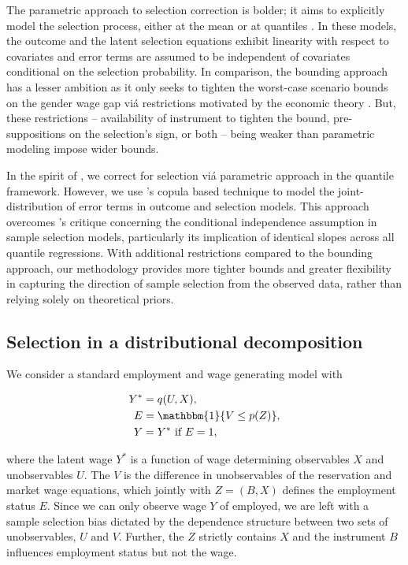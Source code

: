 The parametric approach to selection correction is bolder; it aims to explicitly model the selection process, either at the mean \parencite{Newey2009, Heckman1979, Heckman1974} or at quantiles \parencite{Buchinsky1998}. In these models, the outcome and the latent selection equations exhibit linearity with respect to covariates and error terms are assumed to be independent of covariates conditional on the selection probability. In comparison, the bounding approach has a lesser ambition as it only seeks to tighten the worst-case scenario bounds on the gender wage gap vi\'{a} restrictions motivated by the economic theory \parencite{Blundell2007}. But, these restrictions -- availability of instrument to tighten the bound, pre-suppositions on the selection's sign, or both -- being weaker than parametric modeling impose wider bounds.\par

In the spirit of \textcite{Buchinsky1998}, we correct for selection vi\'{a} parametric approach in  the quantile framework. However, we use \textcite{Arellano2017}'s copula based technique to model the joint-distribution of error terms in outcome and selection models. This approach overcomes \textcite{Huber2015}'s  critique concerning the conditional independence assumption in sample selection models, particularly its implication of identical slopes across all quantile regressions. With additional restrictions compared to the bounding approach, our methodology provides more tighter bounds and greater flexibility in capturing the direction of sample selection from the observed data, rather than relying solely on theoretical priors.\par

\subsection{Selection in  a distributional decomposition} \label{subsec:decomposition}
We consider a standard employment and wage generating model with 
\begin{linenomath*}\begin{align}
	Y^{*} &= q(U, X),\\
	E &= \mathbbm{1} \{V\leq p(Z)\},\\
	Y &= Y^{*} \text{~if~}E = 1,    
\end{align} \end{linenomath*} 
where the latent wage $Y^{*}$ is a function of wage determining observables $X$ and unobservables $U$. The $V$ is the difference in unobservables of the reservation and market wage equations, which jointly with $Z = (B,X)$ defines the employment status $E$. Since we can only observe wage $Y$ of employed, we are left with a sample selection bias dictated by the dependence structure between two sets of unobservables, $U$ and $V$. Further, the $Z$ strictly contains $X$ and the instrument $B$ influences employment status but not the wage.\par

